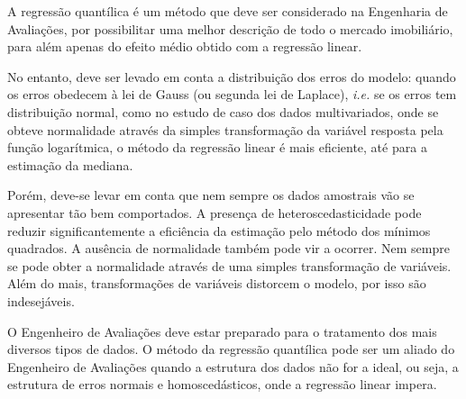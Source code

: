 \documentclass[a4paper, 12pt]{article}
\begin{document}
A regressão quantílica é um método que deve ser considerado na
Engenharia de Avaliações, por possibilitar uma melhor descrição de todo
o mercado imobiliário, para além apenas do efeito médio obtido com a
regressão linear.

No entanto, deve ser levado em conta a distribuição dos erros do modelo:
quando os erros obedecem à lei de Gauss (ou segunda lei de Laplace),
\emph{i.e.} se os erros tem distribuição normal, como no estudo de caso
dos dados multivariados, onde se obteve normalidade através da simples
transformação da variável resposta pela função logarítmica, o método da
regressão linear é mais eficiente, até para a estimação da mediana.

Porém, deve-se levar em conta que nem sempre os dados amostrais vão se
apresentar tão bem comportados. A presença de heteroscedasticidade pode
reduzir significantemente a eficiência da estimação pelo método dos
mínimos quadrados. A ausência de normalidade também pode vir a ocorrer.
Nem sempre se pode obter a normalidade através de uma simples
transformação de variáveis. Além do mais, transformações de variáveis
distorcem o modelo, por isso são indesejáveis.

O Engenheiro de Avaliações deve estar preparado para o tratamento dos
mais diversos tipos de dados. O método da regressão quantílica pode ser
um aliado do Engenheiro de Avaliações quando a estrutura dos dados não
for a ideal, ou seja, a estrutura de erros normais e homoscedásticos,
onde a regressão linear impera.

\printbibliography[title=Referências]
\end{document}
